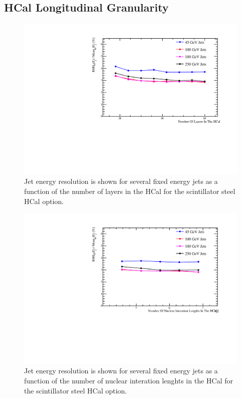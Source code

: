 \subsection{HCal Longitudinal Granularity}
\label{optstud:sec:hcal:nlayers}

\begin{figure}
  \includegraphics[width=\largefigwidth]{OptimisationStudies/Plots/JER_vs_NumberOfLayersInTheHCal.pdf}
  \caption[Jet energy resolution as a function of the number of layers in the HCal for the scintillator steel HCal option.]{Jet energy resolution is shown for several fixed energy jets as a function of the number of layers in the HCal for the scintillator steel HCal option.}
  \label{optstud:fig:hcalnlayers}
\end{figure}

\begin{figure}
  \includegraphics[width=\largefigwidth]{OptimisationStudies/Plots/JER_vs_NumberOfNuclearInterationLengthsInTheHCal.pdf}
  \caption[Jet energy resolution as a function of the number of nuclear interaction lengths in the HCal for the scintillator steel HCal option.]{Jet energy resolution is shown for several fixed energy jets as a function of the number of nuclear interation lenghts in the HCal for the scintillator steel HCal option.}
  \label{optstud:fig:hcaldepth}
\end{figure}

